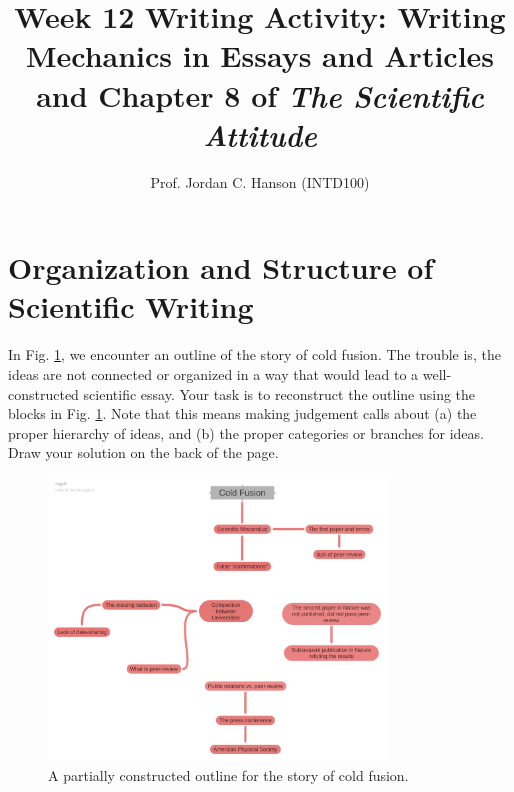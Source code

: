 \documentclass{article}
\begin{document}
\title{Week 12 Writing Activity: Writing Mechanics in Essays and Articles and Chapter 8 of \textit{The Scientific Attitude}}
\author{Prof. Jordan C. Hanson (INTD100)}

\maketitle

\section{Organization and Structure of Scientific Writing}

In Fig. \ref{fig:1}, we encounter an outline of the story of cold fusion.  The trouble is, the ideas are not connected or organized in a way that would lead to a well-constructed scientific essay.  Your task is to reconstruct the outline using the blocks in Fig. \ref{fig:1}.  Note that this means making judgement calls about (a) the proper hierarchy of ideas, and (b) the proper categories or branches for ideas.  Draw your solution on the back of the page.

\begin{figure}[hb]
\centering
\includegraphics[width=0.8\textwidth]{figures/Cold_Fusion.png}
\caption{\label{fig:1} A partially constructed outline for the story of cold fusion.}
\end{figure}
\end{document}

